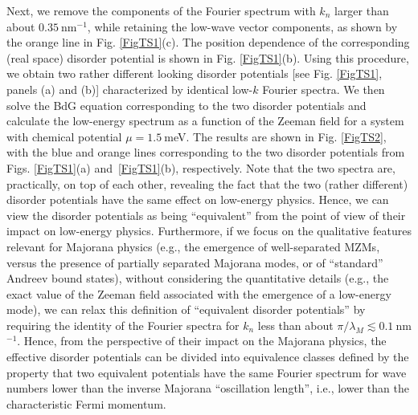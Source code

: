 \documentclass[aps,prmaterials,twocolumn,superscriptaddress,longbibliography]{revtex4-2}
\begin{document}
Next, we remove the components of the Fourier spectrum with $k_n$ larger than about $0.35~$nm$^{-1}$, while retaining the low-wave vector components, as shown by the orange line in  Fig. \ref{FigTS1}(c). The position dependence of the corresponding (real space) disorder potential is shown in 
  Fig. \ref{FigTS1}(b). Using this procedure, we obtain two rather different looking disorder potentials [see Fig.  \ref{FigTS1}, panels (a) and (b)] characterized by identical low-$k$ Fourier spectra. We then solve the BdG equation corresponding to the two disorder potentials and calculate the low-energy spectrum as a function of the Zeeman field for a system with chemical potential $\mu=1.5~$meV. The results are shown in Fig. \ref{FigTS2}, with the blue and orange lines corresponding to the two disorder potentials from Figs. \ref{FigTS1}(a) and~\ref{FigTS1}(b), respectively. Note that the two spectra are, practically, on top of each other, revealing the fact that the two (rather different) disorder potentials have the same effect on low-energy physics. Hence, we can view the disorder potentials as being ``equivalent'' from the point of view of their impact on low-energy physics.
  Furthermore, if we focus on the qualitative features relevant for Majorana physics (e.g., the emergence of well-separated MZMs, versus the presence of partially separated Majorana modes, or of ``standard'' Andreev bound states), without considering the quantitative details (e.g., the exact value of the Zeeman field associated with the emergence of a low-energy mode), we can relax this definition of ``equivalent disorder potentials'' by requiring the identity of the Fourier spectra for $k_n$ less than about $\pi/\lambda_M \lesssim 0.1~$nm$^{-1}$. Hence, from the perspective of their impact on the Majorana physics, the effective disorder potentials can be divided into equivalence classes defined by the property that two equivalent potentials have the same Fourier spectrum for wave numbers lower than the inverse Majorana ``oscillation length'', i.e., lower than the characteristic Fermi momentum.   
\end{document}
